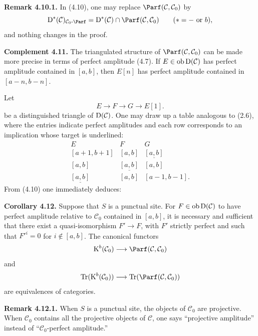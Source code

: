 \textbf{Remark 4.10.1.} In (4.10), one may replace \(\Parf(\mathcal C,\mathcal C_0)\) by
\[
  \Dpx^*(\mathcal C)_{\mathcal C_0\text{-}\Parf}
  =\Dpx^*(\mathcal C)\cap\Parf(\mathcal C,\mathcal C_0)
  \qquad(*=-\text{ or }b),
\]
and nothing changes in the proof.

\textbf{Complement 4.11.} The triangulated structure of \(\Parf(\mathcal C,\mathcal C_0)\) can be made more precise in terms of perfect amplitude (4.7). If \(E\in\Ob\Dpx(\mathcal C)\) has perfect amplitude contained in \([a,b]\), then \(E[n]\) has perfect amplitude contained in \([a-n,b-n]\).

Let
\[
  E\longrightarrow F\longrightarrow G\longrightarrow E[1].
\]
be a distinguished triangle of \(\Dpx(\mathcal C)\). One may draw up a table analogous to (2.6), where the entries indicate perfect amplitudes and each row corresponds to an implication whose target is underlined:
\[
\begin{array}{ccc}
E&F&G\\[0.3em]
{}[a+1,b+1]&{}[a,b]&\underline{[a,b]}\\
{}[a,b]&\underline{[a,b]}&{}[a,b]\\
\underline{[a,b]}&{}[a,b]&{}[a-1,b-1].
\end{array}
\]
From (4.10) one immediately deduces:

\textbf{Corollary 4.12.} Suppose that \(S\) is a punctual site. For \(F\in\Ob\Dpx(\mathcal C)\) to have perfect amplitude relative to \(\mathcal C_0\) contained in \([a,b]\), it is necessary and sufficient that there exist a quasi-isomorphism \(F'\to F\), with \(F'\) strictly perfect and such that \(F'^i=0\) for \(i\notin[a,b]\). The canonical functors
\[
  \Kpx^b(\mathcal C_0)\longrightarrow\Parf(\mathcal C,\mathcal C_0)
\]
and
\[
  \Tr(\Kpx^b(\mathcal C_0))\longrightarrow\Tr(\Parf(\mathcal C,\mathcal C_0))
\]
are equivalences of categories.

\textbf{Remark 4.12.1.} When \(S\) is a punctual site, the objects of \(\mathcal C_0\) are projective. When \(\mathcal C_0\) contains all the projective objects of \(\mathcal C\), one says ``projective amplitude'' instead of ``\(\mathcal C_0\)-perfect amplitude.''



\providecommand{\Cpx}{\mathrm C}
\providecommand{\Kpx}{\mathrm K}
\providecommand{\Dpx}{\mathrm D}
\providecommand{\Ho}{\mathrm H}
\providecommand{\RHom}{\mathrm R\!\operatorname{Hom}}
\providecommand{\Ob}{\operatorname{ob}}
\providecommand{\qis}{\xrightarrow{\sim}}
\providecommand{\RHom}{\mathrm R\!\Hom}
\providecommand{\Ext}{\operatorname{Ext}}
\providecommand{\Hom}{\operatorname{Hom}}
\providecommand{\Tr}{\operatorname{Tr}}

